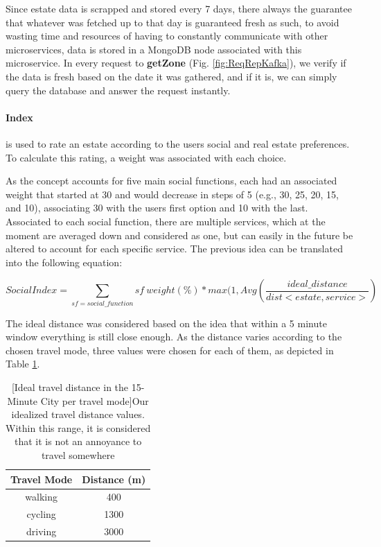 Since estate data is scrapped and stored every 7 days, there always the guarantee that whatever was fetched up to that day is guaranteed fresh as such, to avoid wasting time and resources of having to constantly communicate with other microservices, data is stored in a MongoDB node associated with this microservice. In every request to \textbf{getZone} (Fig. \ref{fig:ReqRepKafka}), we verify if the data is fresh based on the date it was gathered, and if it is, we can simply query the database and answer the request instantly.


\paragraph{Index} is used to rate an estate according to the users social and real estate preferences. To calculate this rating, a weight was associated with each choice. 

As the concept accounts for five main social functions, each had an associated weight that started at 30 and would decrease in steps of 5 (e.g., 30, 25, 20, 15, and 10), associating 30 with the users first option and 10 with the last. Associated to each social function, there are multiple services, which at the moment are averaged down and considered as one, but can easily in the future be altered to account for each specific service. The previous idea can be translated into the following equation:

\begin{equation}
    SocialIndex = \sum_{sf = social\_function} sf \ weight(\%) * max(1, Avg(\frac{ideal\_distance }{dist<estate,service>})
\end{equation}

The ideal distance was considered based on the idea that within a 5 minute window everything is still close enough. As the distance varies according to the chosen travel mode, three values were chosen for each of them, as depicted in Table \ref{tbl:idealTravelDistance}.

\begin{table}[h]
\centering
\caption{[Ideal travel distance in the 15-Minute City per travel mode]{Our idealized travel distance values. Within this range, it is considered that it is not an annoyance to travel somewhere}}
\begin{tabular}{c|c}
Travel Mode & Distance (m) \\ \hline
walking     & 400          \\
cycling     & 1300         \\
driving     & 3000        
\end{tabular}

\label{tbl:idealTravelDistance}
\end{table}



